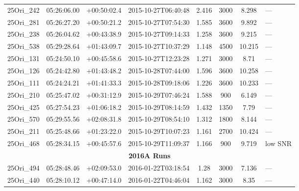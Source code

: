 \documentclass[12pt]{article}
\begin{document}
\begin{table}
\begin{center}
\begin{threeparttable}
\begin{tabular}{lccccccl}
	25Ori\_242    & 05:26:06.00 & +00:50:02.4 & 2015-10-27T06:40:48  & 2.416         & 3000             & 8.298  & ---                      \\
	25Ori\_281    & 05:26:27.20 & +00:50:21.2 & 2015-10-27T07:54:30  & 1.585         & 3600             & 9.892  & ---                      \\
	25Ori\_238    & 05:26:04.62 & +00:43:38.9 & 2015-10-27T09:14:33  & 1.258         & 3600             & 9.215  & ---                      \\
	25Ori\_538    & 05:29:28.64 & +01:43:09.7 & 2015-10-27T10:37:29  & 1.148         & 4500             & 10.215 & ---                      \\
	25Ori\_131    & 05:24:50.10 & +00:45:58.6 & 2015-10-27T12:23:28  & 1.271         & 3000             & 8.71   & ---                      \\
	25Ori\_126    & 05:24:42.80 & +01:43:48.2 & 2015-10-28T07:44:00  & 1.596         & 3600             & 10.258 & ---                      \\
	25Ori\_111    & 05:24:24.21 & +01:41:33.3 & 2015-10-28T09:18:06  & 1.226         & 3600             & 10.233 & ---                      \\
	25Ori\_210    & 05:25:47.02 & +00:31:12.9 & 2015-10-29T07:46:24  & 1.588         & 900              & 6.149  & ---                      \\
	25Ori\_425    & 05:27:54.23 & +01:06:18.2 & 2015-10-29T08:14:59  & 1.432         & 1350             & 7.79   & ---                      \\
	25Ori\_570    & 05:29:55.56 & +02:08:31.8 & 2015-10-29T08:54:10  & 1.312         & 1800             & 8.144  & ---                      \\
	25Ori\_211    & 05:25:48.66 & +01:23:22.0 & 2015-10-29T10:07:23  & 1.161         & 2700             & 10.424 & ---                      \\
	25Ori\_468    & 05:28:34.15 & +00:45:57.6 & 2015-10-29T11:09:37  & 1.166         & 900              & 9.719  & low SNR                  \\
	\multicolumn{8}{c}{{\bf 2016A Runs}} \\
	25Ori\_494    & 05:28:48.46 & +02:09:53.0 & 2016-01-22T03:18:54  & 1.28          & 3000             & 7.136  & ---                      \\
	25Ori\_440    & 05:28:10.12 & +00:47:14.0 & 2016-01-22T04:46:04  & 1.162         & 3000             & 8.35   & ---                      \\

\end{tabular}
\end{threeparttable}
\end{center}
\end{table}
\end{document}
